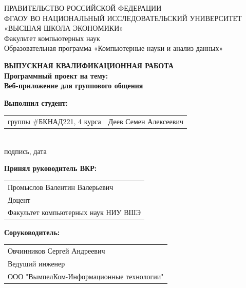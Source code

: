 \begin{titlepage}
\newpage

{
\begin{center}
ПРАВИТЕЛЬСТВО РОССИЙСКОЙ ФЕДЕРАЦИИ\\
ФГАОУ ВО НАЦИОНАЛЬНЫЙ ИССЛЕДОВАТЕЛЬСКИЙ УНИВЕРСИТЕТ\\
«ВЫСШАЯ ШКОЛА ЭКОНОМИКИ»
\\
\bigskip
Факультет компьютерных наук\\
Образовательная программа «Компьютерные науки и анализ данных»
\end{center}
}

\vspace{7em}

\begin{center}
{\bf ВЫПУСКНАЯ КВАЛИФИКАЦИОННАЯ РАБОТА}\\
{\bf Программный проект на тему:}\\
{\bf Веб-приложение для группового общения}\\
\end{center}

\vspace{2em}

{\bf Выполнил студент: \vspace{2mm}}

{
\begin{tabular}{l@{\hskip 1.5cm}l}
группы \#БКНАД221, 4 курса & Деев Семен Алексеевич
\end{tabular}
\par\vspace{1em}
\underline{}\\[-0.2em]
{\indent\footnotesize подпись, дата}
}

\vspace{1em}
{\bf Принял руководитель ВКР: \vspace{2mm}}

{
\begin{tabular}{l}
Промыслов Валентин Валерьевич\\
Доцент \\
Факультет компьютерных наук НИУ ВШЭ
\end{tabular}}

\vspace{1em}
{\bf Соруководитель: \vspace{2mm}}%

{
\begin{tabular}{l}
Овчинников Сергей Андреевич\\
Ведущий инженер\\
ООО "ВымпелКом-Информационные технологии"
\end{tabular}}


\end{titlepage}
